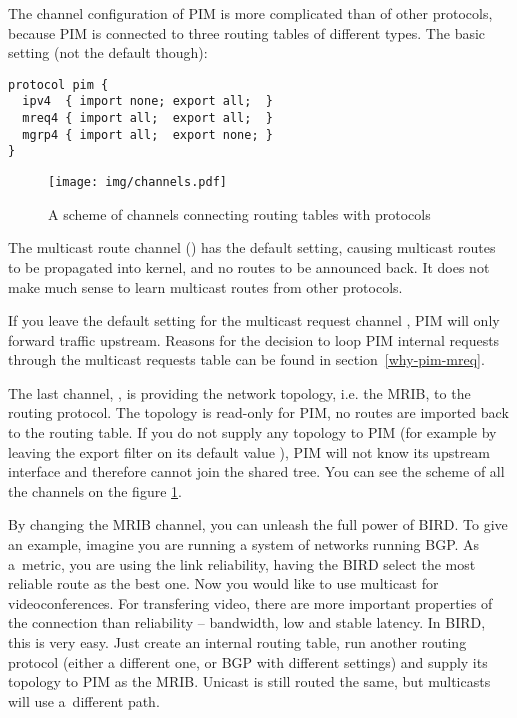 The channel configuration of PIM is more complicated than of other protocols,
because PIM is connected to three routing tables of different types. The basic
setting (not the default though):

\begin{lstlisting}
protocol pim {
  ipv4  { import none; export all;  }
  mreq4 { import all;  export all;  }
  mgrp4 { import all;  export none; }
}
\end{lstlisting}

\begin{figure}[htp]
\centering
\texttt{[image: img/channels.pdf]}
\caption{A scheme of channels connecting routing tables with protocols}
\label{channels}
\end{figure}

\noindent The multicast route channel () has the default setting, causing
multicast routes to be propagated into kernel, and no routes to be announced
back. It does not make much sense to learn multicast routes from other
protocols.

If you leave the default  setting for the multicast request
channel , PIM will only forward traffic upstream. Reasons for the
decision to loop PIM internal requests through the multicast requests table can
be found in section~\ref{why-pim-mreq}.

The last channel, , is providing the network topology, i.e. the MRIB,
to the routing protocol. The topology is read-only for PIM, no routes are
imported back to the routing table. If you do not supply any topology to PIM
(for example by leaving the export filter on its default value ), PIM
will not know its upstream interface and therefore cannot join the shared
tree. You can see the scheme of all the channels on the figure \ref{channels}.

By changing the MRIB channel, you can unleash the full power of BIRD. To give
an example, imagine you are running a system of networks running BGP. As
a~metric, you are using the link reliability, having the BIRD select the most
reliable route as the best one. Now you would like to use multicast for
videoconferences. For transfering video, there are more important properties of
the connection than reliability -- bandwidth, low and stable latency. In BIRD,
this is very easy. Just create an internal routing table, run another routing
protocol (either a different one, or BGP with different settings) and supply
its topology to PIM as the MRIB. Unicast is still routed the same, but
multicasts will use a~different path.

